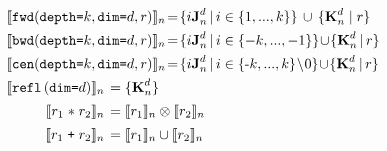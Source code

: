 \begin{align*}
%
%
\setlength{\arraycolsep}{0.2em}
\def\arraystretch{1.4}
\hspace{-0.2em}
\begin{array}{rl}
\multicolumn{2}{l}{\interp{\stenFwdSR{k}{d}{r}}_n\!=\!
 \{i\singleEntry{d}{n} \,|\, i \in \{1, ..., k\} \} \, \cup \, \{
                             \zeroEntry{d}{n} \mid r \}} \\
\multicolumn{2}{l}{\interp{\stenBwdSR{k}{d}{r}}_n\!=\!\{i\singleEntry{d}{n} \,|\, i \in \{-k, ..., -1\} \}\!\cup\!\{
  \zeroEntry{d}{n} \,|\, r \}} \\
\multicolumn{2}{l}{
\interp{\stenCenSR{k}{d}{r}}_n\!=\!\{i\singleEntry{d}{n} \,|\, i \in \{\text{-}k,..., k\}\!\setminus\!0 \}
\!\cup\!\{ \zeroEntry{d}{n} \,|\, r \}} \\
\interp{\stenReflS{d}}_n & = \{ \zeroEntry{d}{n} \} \\
%
%
\interp{r_1 \; \texttt{$\ast$} \; r_2}_n &
= \interp{r_1}_n \otimes \interp{r_2}_n \\
%
%
\interp{r_1 \; \texttt{+} \; r_2}_n &
= \interp{r_1}_n \cup \interp{r_2}_n
\end{array}
\end{align*}\vspace{-0.75em}